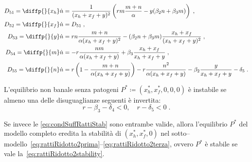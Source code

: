 \begin{equation}
\begin{split}
D_{51} = \diffp{}{{x_h}} \dot{n} &= \frac{1}{(x_h+x_f+y)^2} \left( r m \frac{m+n}{\alpha}
    - y ( \beta_2 n + \beta_3 m ) \right) \; , \\
D_{52} = \diffp{}{{x_f}} \dot{n} &= D_{51} \; , \\
D_{53} = \diffp{}{y} \dot{n} &= r n \frac{m+n}{\alpha (x_h+x_f+y)^2}
    -(\beta_2 n + \beta_3 m) \frac{x_h+x_f}{(x_h+x_f+y)^2} \; , \\
D_{54} = \diffp{}{m} \dot{n} &= - r \frac{n m}{\alpha (x_h+x_f+y)} + \beta_3 \frac{x_h+x_f}{x_h+x_f+y} \;  , \\
D_{55} = \diffp{}{n} \dot{n} &= r \left( 1 - \frac{m+n}{\alpha (x_h+x_f+y)} \right)
    - r \frac{n^2}{\alpha (x_h+x_f+y)} - \beta_2 \frac{y}{x_h+x_f+y} - \delta_5 \; .
\end{split}
\end{equation}


\begin{proposizione}
L'equilibrio non banale senza patogeni $P^* \coloneq (x_h^*, x_f^*, 0,0,0)$ è instabile se almeno
una delle disuguaglianze seguenti è invertita:
\begin{equation}
    r - \beta_3 - \delta_4 < 0 , \quad
    r - \delta_5 < 0 \; .
\label{eq:condSuffRattiStab}
\end{equation}

Se invece le \eqref{eq:condSuffRattiStab} sono entrambe valide, allora l'equilibrio $P^*$
del modello completo eredita la stabilità di $(x_h^*, x_f^*, 0)$
nel sotto--modello~\eqref{eq:rattiRidotto2prima}--\eqref{eq:rattiRidotto2terza}, ovvero $P^*$ è stabile se vale la~\eqref{eq:rattiRidotto2stability}.
\end{proposizione}

